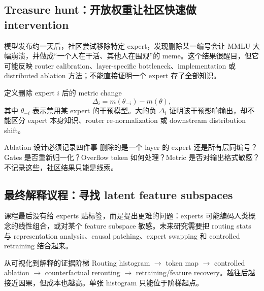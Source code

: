 \subsection{Treasure hunt：开放权重让社区快速做 intervention}

模型发布约一天后，社区尝试移除特定 expert，发现删除某一编号会让 MMLU 大幅崩溃，并做成“一个人在干活、其他人在围观”的 meme。这个结果很醒目，但它可能反映 router calibration、layer-specific bottleneck、implementation 或 distributed ablation 方法；不能直接证明一个 expert 存了全部知识。


定义删除 expert $i$ 后的 metric change
\[
\Delta_i=m(\theta_{-i})-m(\theta),
\]
其中 $\theta_{-i}$ 表示禁用某 expert 的干预模型。大的负 $\Delta_i$ 证明该干预影响输出，却不能区分 expert 本身知识、router re-normalization 或 downstream distribution shift。

\begin{warningbox}{Ablation 设计必须记录四件事}
删除的是一个 layer 的 expert 还是所有层同编号？Gates 是否重新归一化？Overflow token 如何处理？Metric 是否对输出格式敏感？不记录这些，社区结果只能是线索。
\end{warningbox}


\subsection{最终解释议程：寻找 latent feature subspaces}

课程最后没有给 experts 贴标签，而是提出更难的问题：experts 可能编码人类概念的线性组合，或对某个 feature subspace 敏感。未来研究需要把 routing stats 与 representation analysis、causal patching、expert swapping 和 controlled retraining 结合起来。


\begin{importantbox}{从可视化到解释的证据阶梯}
Routing histogram $\rightarrow$ token map $\rightarrow$ controlled ablation $\rightarrow$ counterfactual rerouting $\rightarrow$ retraining/feature recovery。越往后越接近因果，但成本也越高。单张 histogram 只能位于阶梯起点。
\end{importantbox}

